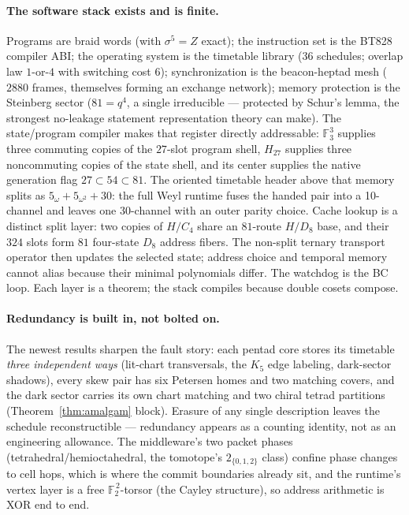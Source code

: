 \documentclass[11pt]{article}
\newcommand{\GF}[1]{\mathbb{F}_{#1}}
\begin{document}
\paragraph{The software stack exists and is finite.}  Programs are
braid words (with $\sigma^5=Z$ exact); the instruction set is the
BT828 compiler ABI; the operating system is the timetable library
(36 schedules; overlap law $1$-or-$4$ with switching cost $6$);
synchronization is the beacon-heptad mesh ($2880$ frames, themselves
forming an exchange network); memory protection is the Steinberg
sector ($81=q^4$, a single irreducible --- protected by Schur's
lemma, the strongest no-leakage statement representation theory can
make).  The state/program compiler makes that register directly
addressable: $\GF3^3$ supplies three commuting copies of the
$27$-slot program shell, $H_{27}$ supplies three noncommuting copies
of the state shell, and its center supplies the native generation
flag $27\subset54\subset81$.  The oriented timetable header above
that memory splits as $5_{\omega}+5_{\omega^2}+30$: the full Weyl
runtime fuses the handed pair into a 10-channel and leaves one
30-channel with an outer parity choice.  Cache lookup is a distinct
split layer: two copies of $H/C_4$ share an $81$-route $H/D_8$ base,
and their $324$ slots form $81$ four-state $D_8$ address fibers.  The
non-split ternary transport operator then updates the selected state;
address choice and temporal memory cannot alias because their minimal
polynomials differ.  The watchdog is the BC loop.
Each layer is a theorem; the
stack compiles because double cosets compose.

\paragraph{Redundancy is built in, not bolted on.}  The newest
results sharpen the fault story: each pentad core stores its
timetable \emph{three independent ways} (lit-chart transversals, the
$K_5$ edge labeling, dark-sector shadows), every skew pair has six
Petersen homes and two matching covers, and the dark sector carries
its own chart matching and two chiral tetrad partitions
(Theorem~\ref{thm:amalgam} block).  Erasure of any single
description leaves the schedule reconstructible --- redundancy
appears as a counting identity, not as an engineering allowance.
The middleware's two packet phases (tetrahedral/hemioctahedral, the
tomotope's $2_{\{0,1,2\}}$ class) confine phase changes to cell
hops, which is where the commit boundaries already sit, and the
runtime's vertex layer is a free $\GF2^{\,2}$-torsor (the Cayley
structure), so address arithmetic is XOR end to end.
\end{document}
